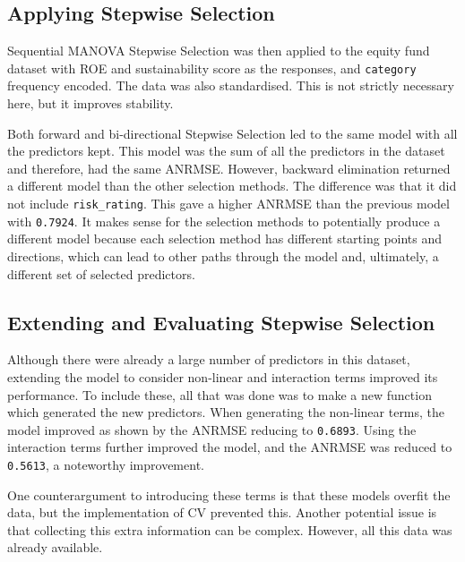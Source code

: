 \documentclass[11pt]{report} %
\begin{document}
\subsection{Applying Stepwise Selection}
\label{pre}
Sequential MANOVA Stepwise Selection was then applied to the equity fund dataset with ROE and sustainability score as the responses, and \texttt{category} frequency encoded. The data was also standardised. This is not strictly necessary here, but it improves stability.

Both forward and bi-directional Stepwise Selection led to the same model with all the predictors kept. This model was the sum of all the predictors in the dataset and therefore, had the same ANRMSE. However, backward elimination returned a different model than the other selection methods. The difference was that it did not include \texttt{risk\_rating}. This gave a higher ANRMSE than the previous model with \texttt{0.7924}. It makes sense for the selection methods to potentially produce a different model because each selection method has different starting points and directions, which can lead to other paths through the model and, ultimately, a different set of selected predictors.

\subsection{Extending and Evaluating Stepwise Selection}
Although there were already a large number of predictors in this dataset, extending the model to consider non-linear and interaction terms improved its performance. To include these, all that was done was to make a new function which generated the new predictors. When generating the non-linear terms, the model improved as shown by the ANRMSE reducing to \texttt{0.6893}. Using the interaction terms further improved the model, and the ANRMSE was reduced to \texttt{0.5613}, a noteworthy improvement. 

One counterargument to introducing these terms is that these models overfit the data, but the implementation of CV prevented this. Another potential issue is that collecting this extra information can be complex. However, all this data was already available.
\end{document}
